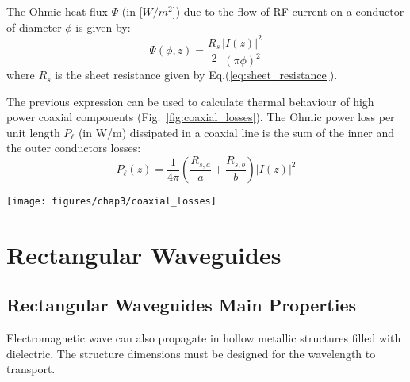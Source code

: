 The Ohmic heat flux $\Psi$ (in [$\si{W/m^2}$]) due to the flow of RF current on a conductor of diameter $\phi$ is given by:
\begin{equation}
\Psi(\phi,z) 
=
\frac{R_s}{2}
\frac{|I(z)|^2}{(\pi \phi)^2}
\label{eq:ohmic_heat_flux_coaxial}
\end{equation}
where $R_s$ is the sheet resistance given by Eq.(\ref{eq:sheet_resistance}).

The previous expression can be used to calculate thermal behaviour of high power coaxial components (Fig.~\ref{fig:coaxial_losses}). The Ohmic power loss per unit length $P_\ell$ (in \si{W/m}) dissipated in a coaxial line is the sum of the inner and the outer conductors losses:
\begin{equation}
P_\ell (z)
=
\frac{1}{4 \pi}
\left(
\frac{R_{s,a}}{a} + \frac{R_{s,b}}{b}
\right)
|I(z)|^2
\end{equation}


\begin{figure*}
	\centering
	\texttt{[image: figures/chap3/coaxial\_losses]}
	\caption{Coaxial losses in a 2~meter 30~\si{\Omega} 9" coaxial line with $P_\mathrm{i}=500~\si{kW}$ and  $P_\mathrm{r}=300~\si{kW}$ at 100~\si{MHz}. Inner conductor is in copper while the outer conductor is in aluminium. Heat flux from Eq.(\ref{eq:ohmic_heat_flux_coaxial}) is benchmarked against full-wave ANSYS HFSS.}
	\label{fig:coaxial_losses}
\end{figure*}


\section{Rectangular Waveguides}\label{sec:rectangular_waveguide}
\subsection{Rectangular Waveguides Main Properties}
Electromagnetic wave can also propagate in hollow metallic structures filled with dielectric. The structure dimensions must be designed for the wavelength to transport. 

